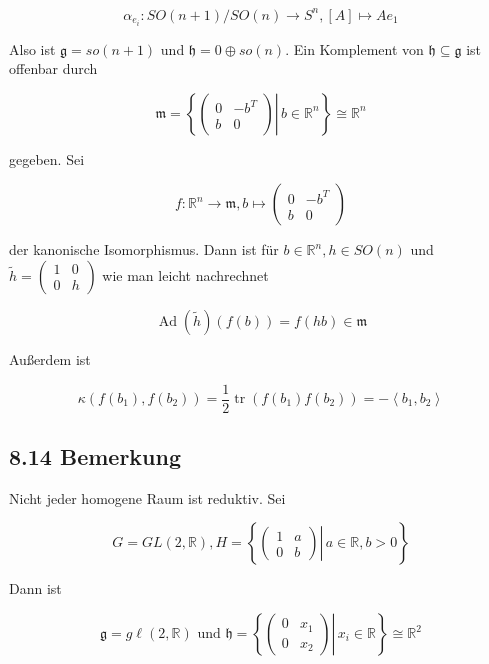 \documentclass[10pt, letterpaper]{article}
\begin{document}
$$
\alpha_{e_{i}}: S O(n+1) / S O(n) \rightarrow S^{n},[A] \mapsto A e_{1}
$$

Also ist $\mathfrak{g}=s o(n+1)$ und $\mathfrak{h}=0 \oplus s o(n)$. Ein Komplement von $\mathfrak{h} \subseteq \mathfrak{g}$ ist offenbar durch

$$
\mathfrak{m}=\left\{\left.\left(\begin{array}{cc}
0 & -b^{T} \\
b & 0
\end{array}\right) \right\rvert\, b \in \mathbb{R}^{n}\right\} \cong \mathbb{R}^{n}
$$

gegeben. Sei

$$
f: \mathbb{R}^{n} \rightarrow \mathfrak{m}, b \mapsto\left(\begin{array}{cc}
0 & -b^{T} \\
b & 0
\end{array}\right)
$$

der kanonische Isomorphismus. Dann ist für $b \in \mathbb{R}^{n}, h \in S O(n)$ und $\tilde{h}=\left(\begin{array}{ll}1 & 0 \\ 0 & h\end{array}\right)$ wie man leicht nachrechnet

$$
\operatorname{Ad}(\tilde{h})(f(b))=f(h b) \in \mathfrak{m}
$$

Außerdem ist

$$
\kappa\left(f\left(b_{1}\right), f\left(b_{2}\right)\right)=\frac{1}{2} \operatorname{tr}\left(f\left(b_{1}\right) f\left(b_{2}\right)\right)=-\left\langle b_{1}, b_{2}\right\rangle
$$

\subsection*{8.14 Bemerkung}
Nicht jeder homogene Raum ist reduktiv. Sei

$$
G=G L(2, \mathbb{R}), H=\left\{\left.\left(\begin{array}{cc}
1 & a \\
0 & b
\end{array}\right) \right\rvert\, a \in \mathbb{R}, b>0\right\}
$$

Dann ist

$$
\mathfrak{g}=g \ell(2, \mathbb{R}) \text { und } \mathfrak{h}=\left\{\left.\left(\begin{array}{ll}
0 & x_{1} \\
0 & x_{2}
\end{array}\right) \right\rvert\, x_{i} \in \mathbb{R}\right\} \cong \mathbb{R}^{2}
$$
\end{document}
